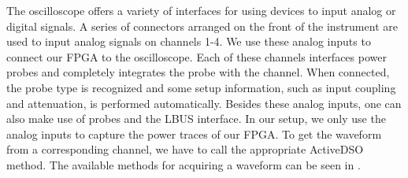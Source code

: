 The oscilloscope offers a variety of interfaces for using devices to input analog or digital signals. 
A series of connectors arranged on the front of the instrument are used to input analog signals on channels 1-4. 
We use these analog inputs to connect our FPGA to the oscilloscope. 
Each of these channels interfaces power probes and completely integrates the probe with the channel. 
When connected, the probe type is recognized and some setup information, such as input coupling and attenuation, is performed automatically.
Besides these analog inputs, one can also make use of probes and the LBUS interface.
In our setup, we only use the analog inputs to capture the power traces of our FPGA.
To get the waveform from a corresponding channel, we have to call the appropriate ActiveDSO method.
The available methods for acquiring a waveform can be seen in \cite{activedso2015guide}.
%
%	
%	
